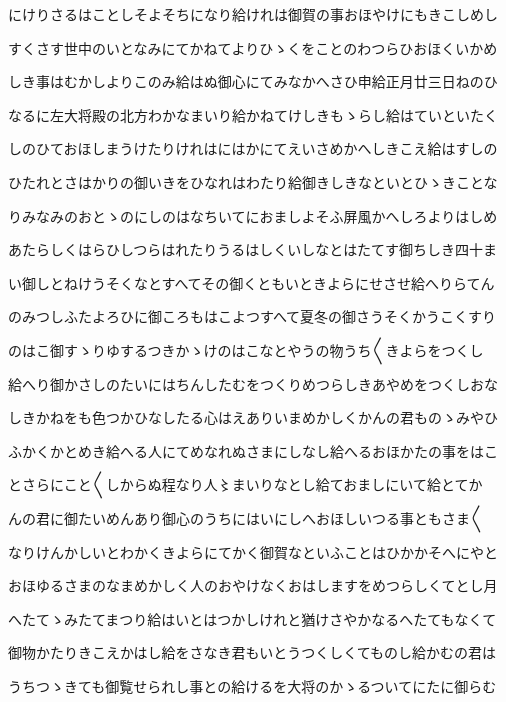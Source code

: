 \documentclass[a4paper,11pt,landscape]{ltjtarticle}
\begin{document}
\par\medskip
にけりさるはことしそよそちになり給けれは御賀の事おほやけにもきこしめし
\par\medskip
すくさす世中のいとなみにてかねてよりひゝくをことのわつらひおほくいかめ
\par\medskip
しき事はむかしよりこのみ給はぬ御心にてみなかへさひ申給正月廿三日ねのひ
\par\medskip
なるに左大将殿の北方わかなまいり給かねてけしきもゝらし給はていといたく
\par\medskip
しのひておほしまうけたりけれはにはかにてえいさめかへしきこえ給はすしの
\par\medskip
ひたれとさはかりの御いきをひなれはわたり給御きしきなといとひゝきことな
\par\medskip
りみなみのおとゝのにしのはなちいてにおましよそふ屏風かへしろよりはしめ
\par\medskip
あたらしくはらひしつらはれたりうるはしくいしなとはたてす御ちしき四十ま
\par\medskip
い御しとねけうそくなとすへてその御くともいときよらにせさせ給へりらてん
\par\medskip
のみつしふたよろひに御ころもはこよつすへて夏冬の御さうそくかうこくすり
\par\medskip
のはこ御すゝりゆするつきかゝけのはこなとやうの物うち〱きよらをつくし
\par\medskip
給へり御かさしのたいにはちんしたむをつくりめつらしきあやめをつくしおな
\par\medskip
しきかねをも色つかひなしたる心はえありいまめかしくかんの君ものゝみやひ
\par\medskip
ふかくかとめき給へる人にてめなれぬさまにしなし給へるおほかたの事をはこ
\par\medskip
とさらにこと〱しからぬ程なり人〻まいりなとし給ておましにいて給とてか
\par\medskip
んの君に御たいめんあり御心のうちにはいにしへおほしいつる事ともさま〱
\par\medskip
なりけんかしいとわかくきよらにてかく御賀なといふことはひかかそへにやと
\par\medskip
おほゆるさまのなまめかしく人のおやけなくおはしますをめつらしくてとし月
\par\medskip
へたてゝみたてまつり給はいとはつかしけれと猶けさやかなるへたてもなくて
\par\medskip
御物かたりきこえかはし給をさなき君もいとうつくしくてものし給かむの君は
\par\medskip
うちつゝきても御覧せられし事との給けるを大将のかゝるついてにたに御らむ
\par\medskip
\end{document}
